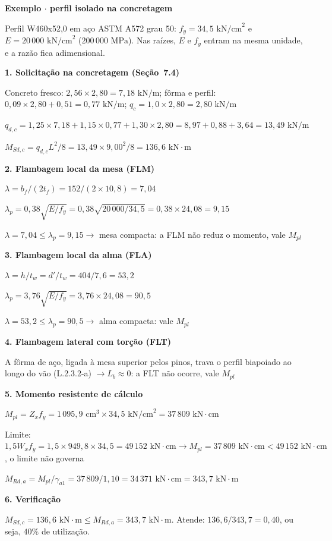\documentclass[11pt,a4paper]{article}
\newcommand{\caixaexemplo}[2]{%
  \par\vspace{6pt}\noindent\colorbox{examplebg}{%
    \parbox{\dimexpr\linewidth-2\fboxsep\relax}{%
      \vspace{4pt}\textbf{\color{exampleaccent}#1}\par\vspace{3pt}#2\vspace{4pt}%
    }%
  }\par\vspace{6pt}%
}
\begin{document}
\caixaexemplo{Exemplo $\cdot$ perfil isolado na concretagem}{%
Perfil W460x52,0 em aço ASTM A572 grau 50: $f_y = 34{,}5\text{ kN/cm}^2$ e $E = 20\,000\text{ kN/cm}^2$ ($200\,000\text{ MPa}$). Nas raízes, $E$ e $f_y$ entram na mesma unidade, e a razão fica adimensional.\par\vspace{3pt}
\textbf{1. Solicitação na concretagem (Seção~7.4)}\par
Concreto fresco: $2{,}56 \times 2{,}80 = 7{,}18\text{ kN/m}$; fôrma e perfil: $0{,}09 \times 2{,}80 + 0{,}51 = 0{,}77\text{ kN/m}$; $q_c = 1{,}0 \times 2{,}80 = 2{,}80\text{ kN/m}$\par
$q_{d,c} = 1{,}25 \times 7{,}18 + 1{,}15 \times 0{,}77 + 1{,}30 \times 2{,}80 = 8{,}97 + 0{,}88 + 3{,}64 = 13{,}49\text{ kN/m}$\par
$M_{Sd,c} = q_{d,c} L^2/8 = 13{,}49 \times 9{,}00^2/8 = 136{,}6\text{ kN}\cdot\text{m}$\par\vspace{3pt}
\textbf{2. Flambagem local da mesa (FLM)}\par
$\lambda = b_f/(2 t_f) = 152/(2 \times 10{,}8) = 7{,}04$\par
$\lambda_p = 0{,}38\sqrt{E/f_y} = 0{,}38\sqrt{20\,000/34{,}5} = 0{,}38 \times 24{,}08 = 9{,}15$\par
$\lambda = 7{,}04 \le \lambda_p = 9{,}15 \rightarrow$ mesa compacta: a FLM não reduz o momento, vale $M_{pl}$\par\vspace{3pt}
\textbf{3. Flambagem local da alma (FLA)}\par
$\lambda = h/t_w = d'/t_w = 404/7{,}6 = 53{,}2$\par
$\lambda_p = 3{,}76\sqrt{E/f_y} = 3{,}76 \times 24{,}08 = 90{,}5$\par
$\lambda = 53{,}2 \le \lambda_p = 90{,}5 \rightarrow$ alma compacta: vale $M_{pl}$\par\vspace{3pt}
\textbf{4. Flambagem lateral com torção (FLT)}\par
A fôrma de aço, ligada à mesa superior pelos pinos, trava o perfil biapoiado ao longo do vão (L.2.3.2-a) $\rightarrow L_b \approx 0$: a FLT não ocorre, vale $M_{pl}$\par\vspace{3pt}
\textbf{5. Momento resistente de cálculo}\par
$M_{pl} = Z_x f_y = 1\,095{,}9\text{ cm}^3 \times 34{,}5\text{ kN/cm}^2 = 37\,809\text{ kN}\cdot\text{cm}$\par
Limite: $1{,}5 W_x f_y = 1{,}5 \times 949{,}8 \times 34{,}5 = 49\,152\text{ kN}\cdot\text{cm} \rightarrow M_{pl} = 37\,809\text{ kN}\cdot\text{cm} < 49\,152\text{ kN}\cdot\text{cm}$, o limite não governa\par
$M_{Rd,a} = M_{pl}/\gamma_{a1} = 37\,809/1{,}10 = 34\,371\text{ kN}\cdot\text{cm} = 343{,}7\text{ kN}\cdot\text{m}$\par\vspace{3pt}
\textbf{6. Verificação}\par
$M_{Sd,c} = 136{,}6\text{ kN}\cdot\text{m} \le M_{Rd,a} = 343{,}7\text{ kN}\cdot\text{m}$. Atende: $136{,}6/343{,}7 = 0{,}40$, ou seja, $40\%$ de utilização.}
\end{document}
